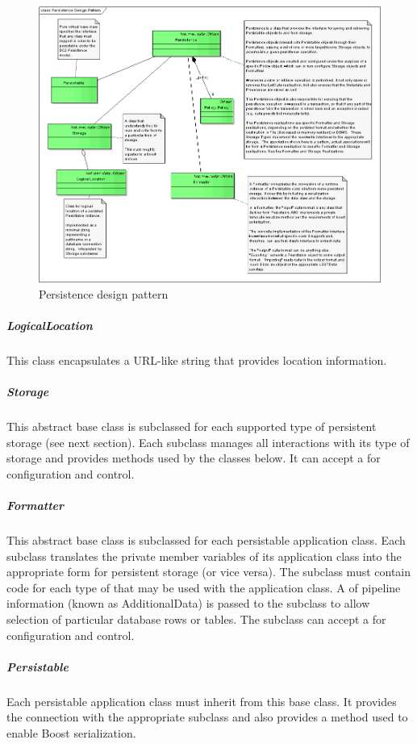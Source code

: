 \begin{figure}[htbp]
\includegraphics[width=\textwidth]{figures/PersistenceDesign.png}
\caption{Persistence design pattern}
\label{persistence-design}
\end{figure}

\subparagraph{LogicalLocation}
This class encapsulates a URL-like string that provides location
information.

\subparagraph{Storage}
This abstract base class is subclassed for each supported type of
persistent storage (see next section).  Each subclass manages all
interactions with its type of storage and provides methods used by the
 classes below.  It can accept a  for configuration and
control.

\subparagraph{Formatter}
This abstract base class is subclassed for each persistable application
class.  Each subclass translates the private member variables of its
application class into the appropriate form for persistent storage (or
vice versa).  The subclass must contain code for each type of 
that may be used with the application class.  A  of pipeline
information (known as AdditionalData) is passed to the subclass to allow
selection of particular database rows or tables.  The subclass can
accept a  for configuration and control.

\subparagraph{Persistable}
Each persistable application class must inherit from this base class.
It provides the connection with the appropriate  subclass and
also provides a method used to enable Boost serialization.

